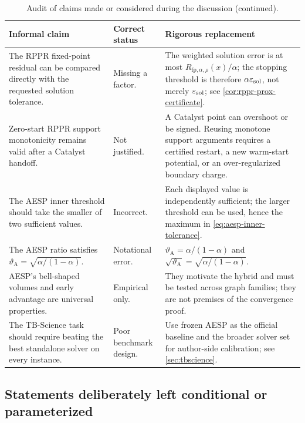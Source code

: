 \begin{table}[p]
\centering
\caption{Audit of claims made or considered during the discussion
(continued).}
\begin{tabularx}{\textwidth}{@{}p{}p{}X@{}}
\toprule
Informal claim & Correct status & Rigorous replacement \\
\midrule

The RPPR fixed-point residual can be compared directly with the requested
solution tolerance.
& Missing a factor.
& The weighted solution error is at most \(R_{\mathrm{fp},\alpha,\rho}(x)/\alpha\); the stopping
threshold is therefore \(\alpha\varepsilon_{\mathrm{sol}}\), not merely
\(\varepsilon_{\mathrm{sol}}\); see \cref{cor:rppr-prox-certificate}. \\

Zero-start RPPR support monotonicity remains valid after a Catalyst handoff.
& Not justified.
& A Catalyst point can overshoot or be signed.  Reusing monotone support
arguments requires a certified restart, a new warm-start potential, or an
over-regularized boundary charge. \\

The AESP inner threshold should take the smaller of two sufficient values.
& Incorrect.
& Each displayed value is independently sufficient; the larger threshold can
be used, hence the maximum in \cref{eq:aesp-inner-tolerance}. \\

The AESP ratio satisfies
\(\vartheta_{\mathrm A}=\sqrt{\alpha/(1-\alpha)}\).
& Notational error.
& \(\vartheta_{\mathrm A}=\alpha/(1-\alpha)\) and
\(\sqrt{\vartheta_{\mathrm A}}=\sqrt{\alpha/(1-\alpha)}\). \\

AESP's bell-shaped volumes and early advantage are universal properties.
& Empirical only.
& They motivate the hybrid and must be tested across graph families; they are
not premises of the convergence proof. \\

The TB-Science task should require beating the best standalone solver on every
instance.
& Poor benchmark design.
& Use frozen AESP as the official baseline and the broader solver set for
author-side calibration; see \cref{sec:tbscience}. \\
\bottomrule
\end{tabularx}
\end{table}
\clearpage

\subsection{Statements deliberately left conditional or parameterized}

